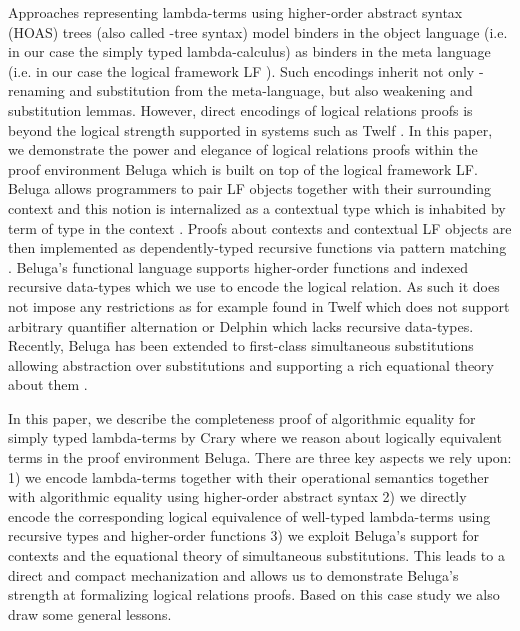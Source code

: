 \documentclass[copyright,creativecommons]{eptcs}
\begin{document}
Approaches representing lambda-terms using higher-order abstract syntax (HOAS) trees (also called -tree syntax) model binders in the object language (i.e. in our case the simply typed lambda-calculus) as binders in the meta language (i.e. in our case the logical framework LF \citep{Harper93jacm}). Such encodings inherit not only -renaming and substitution from the meta-language, but also weakening and substitution lemmas. However, direct encodings of logical relations proofs is beyond the logical strength supported in systems such as Twelf \citep{Pfenning99cade}. In this paper, we demonstrate the power and elegance of logical relations proofs within the proof environment Beluga \citep{Pientka:IJCAR10} which is built on top of the logical framework LF. Beluga allows programmers to pair LF objects together with their surrounding context and 
this notion is internalized  as a contextual type  which is inhabited by term  of type  in the context  \citep{Nanevski:ICML05}.  Proofs about contexts and contextual LF objects are then implemented as dependently-typed recursive functions via pattern matching \citep{Pientka:POPL08,Pientka:PPDP08}.  Beluga's functional language supports higher-order functions and indexed recursive data-types \citep{Cave:POPL12} which we use to encode the logical relation. As such it does not impose any restrictions as for example found in Twelf \citep{Pfenning99cade} which does not support arbitrary quantifier alternation or Delphin \citep{Schuermann:ESOP08} which lacks recursive data-types. Recently, Beluga has been extended to first-class simultaneous substitutions allowing abstraction over substitutions and supporting a rich equational theory about them \citep{Cave:LFMTP13,Pientka:CADE15}.  

In this paper, we describe the completeness proof of algorithmic equality for simply typed
lambda-terms by Crary \cite{Crary:ATAPL} where we reason about logically equivalent terms
in the proof environment Beluga.  There are three key aspects we rely
upon: 1) we encode lambda-terms together with their 
operational semantics together with algorithmic equality using higher-order abstract syntax 
2) we directly encode the corresponding logical equivalence of well-typed lambda-terms using recursive  types and higher-order functions 3) we exploit Beluga's support for contexts and
the equational theory of simultaneous substitutions. This leads to a
direct and compact mechanization and allows us to demonstrate Beluga's strength at
formalizing logical relations proofs. Based on this case study we also draw some general lessons.
\end{document}
